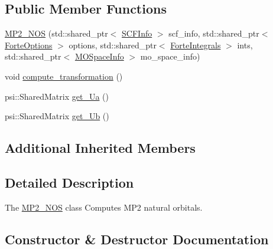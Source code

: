 \subsection*{Public Member Functions}
\begin{DoxyCompactItemize}
\item 
\mbox{\hyperlink{classforte_1_1_m_p2___n_o_s_aa28502dcb5412e823918d9cec490e06e}{M\+P2\+\_\+\+N\+OS}} (std\+::shared\+\_\+ptr$<$ \mbox{\hyperlink{classforte_1_1_s_c_f_info}{S\+C\+F\+Info}} $>$ scf\+\_\+info, std\+::shared\+\_\+ptr$<$ \mbox{\hyperlink{classforte_1_1_forte_options}{Forte\+Options}} $>$ options, std\+::shared\+\_\+ptr$<$ \mbox{\hyperlink{classforte_1_1_forte_integrals}{Forte\+Integrals}} $>$ ints, std\+::shared\+\_\+ptr$<$ \mbox{\hyperlink{classforte_1_1_m_o_space_info}{M\+O\+Space\+Info}} $>$ mo\+\_\+space\+\_\+info)
\item 
void \mbox{\hyperlink{classforte_1_1_m_p2___n_o_s_a3c093d2809477add44a5d3df9df56587}{compute\+\_\+transformation}} ()
\item 
psi\+::\+Shared\+Matrix \mbox{\hyperlink{classforte_1_1_m_p2___n_o_s_a7210e806a978b617b5b848dba3628726}{get\+\_\+\+Ua}} ()
\item 
psi\+::\+Shared\+Matrix \mbox{\hyperlink{classforte_1_1_m_p2___n_o_s_a2bb9cdbac921a47dd31b6796c8c8daa1}{get\+\_\+\+Ub}} ()
\end{DoxyCompactItemize}
\subsection*{Additional Inherited Members}


\subsection{Detailed Description}
The \mbox{\hyperlink{classforte_1_1_m_p2___n_o_s}{M\+P2\+\_\+\+N\+OS}} class Computes M\+P2 natural orbitals. 

\subsection{Constructor \& Destructor Documentation}
\mbox{\label{classforte_1_1_m_p2___n_o_s_aa28502dcb5412e823918d9cec490e06e}} 

